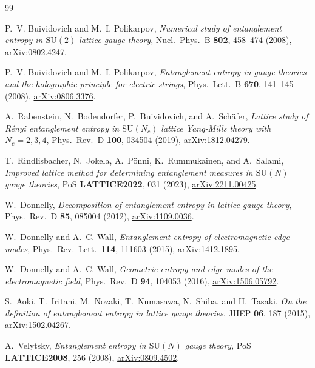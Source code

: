 \documentclass[11pt,a4paper]{article}
\theoremstyle{definition}
\begin{document}
\begin{thebibliography}{99}

P.~V. Buividovich and M.~I. Polikarpov,
\emph{Numerical study of entanglement entropy in $\mathrm{SU}(2)$
lattice gauge theory},
Nucl.\ Phys.\ B \textbf{802}, 458--474 (2008),
\href{https://arxiv.org/abs/0802.4247}{arXiv:0802.4247}.

P.~V. Buividovich and M.~I. Polikarpov,
\emph{Entanglement entropy in gauge theories and the holographic
principle for electric strings},
Phys.\ Lett.\ B \textbf{670}, 141--145 (2008),
\href{https://arxiv.org/abs/0806.3376}{arXiv:0806.3376}.

A.~Rabenstein, N.~Bodendorfer, P.~Buividovich, and A.~Schäfer,
\emph{Lattice study of Rényi entanglement entropy in $\mathrm{SU}(N_c)$
lattice Yang-Mills theory with $N_c = 2, 3, 4$},
Phys.\ Rev.\ D \textbf{100}, 034504 (2019),
\href{https://arxiv.org/abs/1812.04279}{arXiv:1812.04279}.

T.~Rindlisbacher, N.~Jokela, A.~Pönni, K.~Rummukainen, and A.~Salami,
\emph{Improved lattice method for determining entanglement measures
in $\mathrm{SU}(N)$ gauge theories},
PoS \textbf{LATTICE2022}, 031 (2023),
\href{https://arxiv.org/abs/2211.00425}{arXiv:2211.00425}.

W.~Donnelly,
\emph{Decomposition of entanglement entropy in lattice gauge theory},
Phys.\ Rev.\ D \textbf{85}, 085004 (2012),
\href{https://arxiv.org/abs/1109.0036}{arXiv:1109.0036}.

W.~Donnelly and A.~C. Wall,
\emph{Entanglement entropy of electromagnetic edge modes},
Phys.\ Rev.\ Lett.\ \textbf{114}, 111603 (2015),
\href{https://arxiv.org/abs/1412.1895}{arXiv:1412.1895}.

W.~Donnelly and A.~C. Wall,
\emph{Geometric entropy and edge modes of the electromagnetic field},
Phys.\ Rev.\ D \textbf{94}, 104053 (2016),
\href{https://arxiv.org/abs/1506.05792}{arXiv:1506.05792}.

S.~Aoki, T.~Iritani, M.~Nozaki, T.~Numasawa, N.~Shiba, and H.~Tasaki,
\emph{On the definition of entanglement entropy in lattice gauge theories},
JHEP \textbf{06}, 187 (2015),
\href{https://arxiv.org/abs/1502.04267}{arXiv:1502.04267}.

A.~Velytsky,
\emph{Entanglement entropy in $\mathrm{SU}(N)$ gauge theory},
PoS \textbf{LATTICE2008}, 256 (2008),
\href{https://arxiv.org/abs/0809.4502}{arXiv:0809.4502}.


\end{thebibliography}
\end{document}
